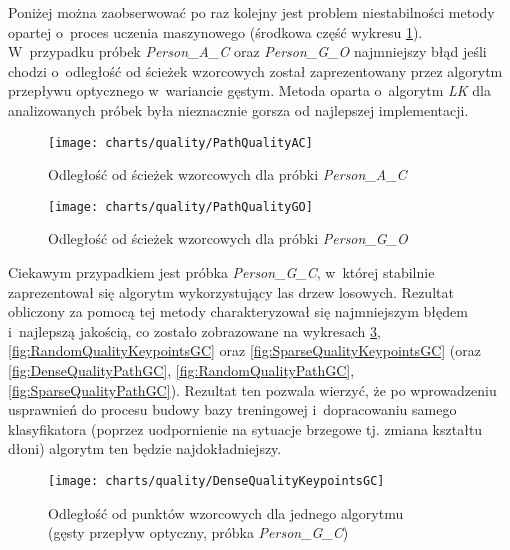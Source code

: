     Poniżej można zaobserwować po raz kolejny jest problem niestabilności metody opartej o~proces uczenia maszynowego (środkowa część wykresu \ref{fig:PathQualityAC}). W~przypadku próbek \textit{Person\_A\_C} oraz \textit{Person\_G\_O} najmniejszy błąd jeśli chodzi o~odległość od ścieżek wzorcowych został zaprezentowany przez algorytm przepływu optycznego w~wariancie gęstym. Metoda oparta o~algorytm \textit{LK} dla analizowanych próbek była nieznacznie gorsza od najlepszej implementacji.

    \newpage
    \begin{figure}[!ht]
      \centering
      \texttt{[image: charts/quality/PathQualityAC]}
      \caption[Odległość od ścieżek wzorcowych]
              {Odległość od ścieżek wzorcowych dla próbki \textit{Person\_A\_C}}
      \label{fig:PathQualityAC}
    \end{figure}

    \begin{figure}[!ht]
      \centering
      \texttt{[image: charts/quality/PathQualityGO]}
      \caption[Odległość od ścieżek wzorcowych]
              {Odległość od ścieżek wzorcowych dla próbki \textit{Person\_G\_O}}
      \label{fig:PathQualityGO}
    \end{figure}

    Ciekawym przypadkiem jest próbka \textit{Person\_G\_C}, w~której stabilnie zaprezentował się algorytm wykorzystujący las drzew losowych. Rezultat obliczony za pomocą tej metody charakteryzował się najmniejszym błędem i~najlepszą jakością, co zostało zobrazowane na wykresach \ref{fig:DenseQualityKeypointsGC}, \ref{fig:RandomQualityKeypointsGC} oraz \ref{fig:SparseQualityKeypointsGC} (oraz \ref{fig:DenseQualityPathGC}, \ref{fig:RandomQualityPathGC}, \ref{fig:SparseQualityPathGC}). Rezultat ten pozwala wierzyć, że po wprowadzeniu usprawnień do procesu budowy bazy treningowej i~dopracowaniu samego klasyfikatora (poprzez uodpornienie na sytuacje brzegowe tj. zmiana kształtu dłoni) algorytm ten będzie najdokładniejszy.

    \newpage
    \begin{figure}[!ht]
      \centering
      \texttt{[image: charts/quality/DenseQualityKeypointsGC]}
      \caption[Odległość od punktów wzorcowych dla jednego algorytmu]
              {Odległość od punktów wzorcowych dla jednego algorytmu\\(gęsty przepływ optyczny, próbka \textit{Person\_G\_C})}
      \label{fig:DenseQualityKeypointsGC}
    \end{figure}

